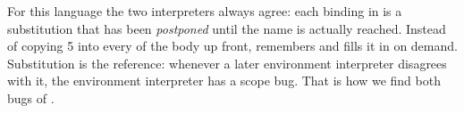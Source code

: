 \begin{keypoint}
For this language the two interpreters always agree: each binding in  is a substitution that has been \emph{postponed} until the name is actually reached. Instead of copying 5 into every  of the body up front,  remembers  and fills it in on demand. Substitution is the reference: whenever a later environment interpreter disagrees with it, the environment interpreter has a scope bug. That is how we find both bugs of .
\end{keypoint}

